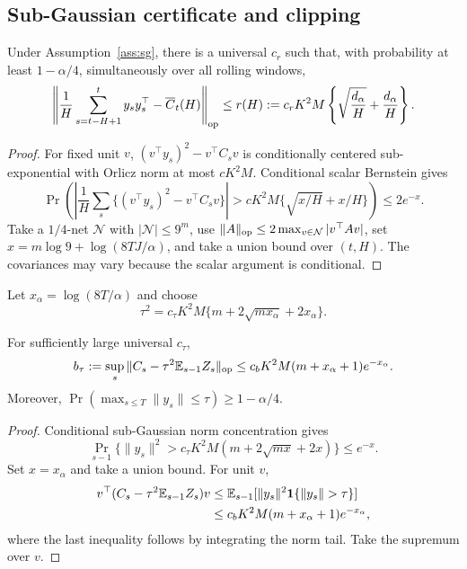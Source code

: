 \subsection{Sub-Gaussian certificate and clipping}

\begin{lemma}
\label{lem:det-radius}
Under Assumption~\ref{ass:sg}, there is a universal $c_r$ such that, with probability at least $1-\alpha/4$, simultaneously over all rolling windows,
\begin{equation}
 \left\|\frac1H\sum_{s=t-H+1}^t y_sy_s^\top-\overline C_t(H)\right\|_{\mathrm{op}}
 \le r(H):=c_rK^2M\left\{\sqrt{\frac{d_\alpha}{H}}+\frac{d_\alpha}{H}\right\}.
 \label{eq:det-radius-app}
\end{equation}
\end{lemma}

\begin{proof}
For fixed unit $v$, $(v^\top y_s)^2-v^\top C_sv$ is conditionally centered sub-exponential with Orlicz norm at most $cK^2M$.  Conditional scalar Bernstein gives
\begin{equation}
 \Pr\left(\left|\frac1H\sum_s\{(v^\top y_s)^2-v^\top C_sv\}\right|>cK^2M\{\sqrt{x/H}+x/H\}\right)\le2e^{-x}.
\end{equation}
Take a $1/4$-net $\mathcal N$ with $|\mathcal N|\le9^m$, use $\|A\|_{\mathrm{op}}\le2\max_{v\in\mathcal N}|v^\top Av|$, set $x=m\log9+\log(8TJ/\alpha)$, and take a union bound over $(t,H)$.  The covariances may vary because the scalar argument is conditional.  \end{proof}

Let $x_\alpha=\log(8T/\alpha)$ and choose
\begin{equation}
 \tau^2=c_\tau K^2M\{m+2\sqrt{mx_\alpha}+2x_\alpha\}.
 \label{eq:tau-app}
\end{equation}

\begin{lemma}
\label{lem:clip}
For sufficiently large universal $c_\tau$,
\begin{equation}
 b_\tau:=\sup_s\|C_s-\tau^2\mathbb E_{s-1}Z_s\|_{\mathrm{op}}
 \le c_bK^2M(m+x_\alpha+1)e^{-x_\alpha}.
 \label{eq:clip-bias-app}
\end{equation}
Moreover, $\Pr(\max_{s\le T}\|y_s\|\le\tau)\ge1-\alpha/4$.
\end{lemma}

\begin{proof}
Conditional sub-Gaussian norm concentration gives
\begin{equation}
 \Pr_{s-1}\{\|y_s\|^2>c_\tau K^2M(m+2\sqrt{mx}+2x)\}\le e^{-x}.
\end{equation}
Set $x=x_\alpha$ and take a union bound.  For unit $v$,
\begin{align}
 v^\top(C_s-\tau^2\E_{s-1}Z_s)v
 &\le \E_{s-1}[\|y_s\|^2\mathbf1\{\|y_s\|>\tau\}]\\
 &\le c_bK^2M(m+x_\alpha+1)e^{-x_\alpha},
\end{align}
where the last inequality follows by integrating the norm tail.  Take the supremum over $v$.  \end{proof}

